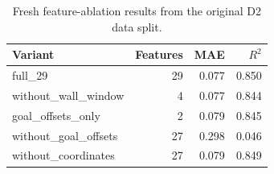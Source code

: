 \begin{table}[ht]
\centering
\small
\begin{tabular}{lrrr}
\toprule
Variant & Features & MAE & $R^2$ \\
\midrule
full\_29 & 29 & 0.077 & 0.850 \\
without\_wall\_window & 4 & 0.077 & 0.844 \\
goal\_offsets\_only & 2 & 0.079 & 0.845 \\
without\_goal\_offsets & 27 & 0.298 & 0.046 \\
without\_coordinates & 27 & 0.079 & 0.849 \\
\bottomrule
\end{tabular}
\caption{Fresh feature-ablation results from the original D2 data split.}
\label{tab:d3_features}
\end{table}
